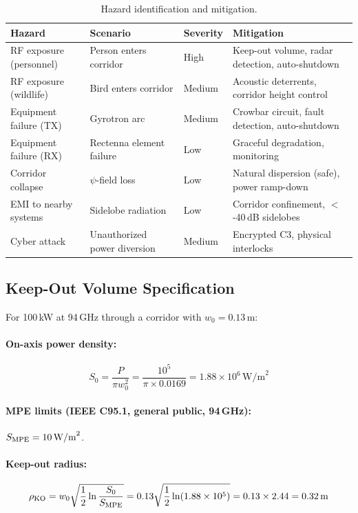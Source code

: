 \documentclass[11pt,a4paper]{article}
\begin{document}
\begin{table}[h]
\centering
\caption{Hazard identification and mitigation.}
\begin{tabular}{p{3cm}p{3cm}p{2cm}p{4cm}}
\toprule
Hazard & Scenario & Severity & Mitigation \\
\midrule
RF exposure (personnel) & Person enters corridor & High & Keep-out volume, radar detection, auto-shutdown \\
RF exposure (wildlife) & Bird enters corridor & Medium & Acoustic deterrents, corridor height control \\
Equipment failure (TX) & Gyrotron arc & Medium & Crowbar circuit, fault detection, auto-shutdown \\
Equipment failure (RX) & Rectenna element failure & Low & Graceful degradation, monitoring \\
Corridor collapse & $\psi$-field loss & Low & Natural dispersion (safe), power ramp-down \\
EMI to nearby systems & Sidelobe radiation & Low & Corridor confinement, $<$-40\,dB sidelobes \\
Cyber attack & Unauthorized power diversion & Medium & Encrypted C3, physical interlocks \\
\bottomrule
\end{tabular}
\end{table}

\subsection{Keep-Out Volume Specification}

For 100\,kW at 94\,GHz through a corridor with $w_0 = 0.13\,\text{m}$:

\paragraph{On-axis power density:}
\begin{equation}
S_0 = \frac{P}{\pi w_0^2} = \frac{10^5}{\pi \times 0.0169}
= 1.88 \times 10^6\,\text{W/m}^2
\end{equation}

\paragraph{MPE limits (IEEE C95.1, general public, 94\,GHz):}
$S_{\rm MPE} = 10\,\text{W/m}^2$.

\paragraph{Keep-out radius:}
\begin{equation}
\rho_{\rm KO} = w_0\sqrt{\frac{1}{2}\ln\frac{S_0}{S_{\rm MPE}}}
= 0.13\sqrt{\frac{1}{2}\ln(1.88 \times 10^5)}
= 0.13 \times 2.44 = 0.32\,\text{m}
\end{equation}
\end{document}
